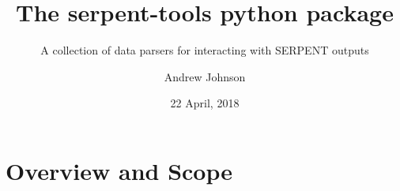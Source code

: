 %
%
%


\title{The serpent-tools python package}
\subtitle{A collection of data parsers for interacting with SERPENT outputs}
\author{Andrew Johnson}
\date{22 April, 2018}

\newcommand{\sss}{\texttt{SERPENT }}
\newcommand{\colShare}{0.48\textwidth}

\newcommand{\backupbegin}{
       \newcounter{framenumberappendix}
          \setcounter{framenumberappendix}{\value{framenumber}}
      }
\newcommand{\backupend}{
     \addtocounter{framenumberappendix}{-\value{framenumber}}
        \addtocounter{framenumber}{\value{framenumberappendix}} 
    }  

\hypersetup{colorlinks,linkcolor=,urlcolor=links}
\newcommand{\toapi}[3]{\href{https://serpent-tools.readthedocs.io/en/latest/api/#1.html\##2.#3}{\texttt{#3}}}
\newcommand{\github}[1]{\url{https://github.com/CORE-GATECH-GROUP/serpent-tools/#1}}
\newcommand{\ghissue}[1]{\href{https://github.com/CORE-GATECH-GROUP/serpent-tools/issues/#1}{GH\##1}}
\newcommand{\ghpull}[1]{\href{https://github.com/CORE-GATECH-GROUP/serpent-tools/pulls/#1}{GH\##1}}


\begin{frame}
\titlepage
\end{frame}

\section{Overview and Scope}


